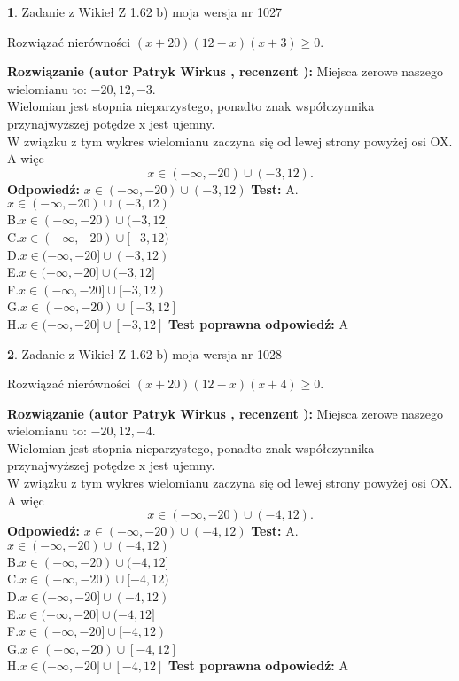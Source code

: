 \documentclass[12pt, a4paper]{article}
\theoremstyle{definition} %
\newtheorem{zad}{}
\newcommand{\zadStart}[1]{\begin{zad}#1\newline}
\newcommand{\zadStop}{\end{zad}}
\newcommand{\rozwStart}[2]{\noindent \textbf{Rozwiązanie (autor #1 , recenzent #2): }\newline}
\newcommand{\rozwStop}{\newline}
\newcommand{\odpStart}{\noindent \textbf{Odpowiedź:}\newline}
\newcommand{\odpStop}{\newline}
\newcommand{\testStart}{\noindent \textbf{Test:}\newline}
\newcommand{\testStop}{\newline}
\newcommand{\kluczStart}{\noindent \textbf{Test poprawna odpowiedź:}\newline}
\newcommand{\kluczStop}{\newline}
\begin{document}
\zadStart{Zadanie z Wikieł Z 1.62 b) moja wersja nr 1027}

Rozwiązać nierówności $(x+20)(12-x)(x+3)\ge0$.
\zadStop
\rozwStart{Patryk Wirkus}{}
Miejsca zerowe naszego wielomianu to: $-20, 12, -3$.\\
Wielomian jest stopnia nieparzystego, ponadto znak współczynnika przy\linebreak najwyższej potędze x jest ujemny.\\ W związku z tym wykres wielomianu zaczyna się od lewej strony powyżej osi OX. A więc $$x \in (-\infty,-20) \cup (-3,12).$$
\rozwStop
\odpStart
$x \in (-\infty,-20) \cup (-3,12)$
\odpStop
\testStart
A.$x \in (-\infty,-20) \cup (-3,12)$\\
B.$x \in (-\infty,-20) \cup (-3,12]$\\
C.$x \in (-\infty,-20) \cup [-3,12)$\\
D.$x \in (-\infty,-20] \cup (-3,12)$\\
E.$x \in (-\infty,-20] \cup (-3,12]$\\
F.$x \in (-\infty,-20] \cup [-3,12)$\\
G.$x \in (-\infty,-20) \cup [-3,12]$\\
H.$x \in (-\infty,-20] \cup [-3,12]$
\testStop
\kluczStart
A
\kluczStop



\zadStart{Zadanie z Wikieł Z 1.62 b) moja wersja nr 1028}

Rozwiązać nierówności $(x+20)(12-x)(x+4)\ge0$.
\zadStop
\rozwStart{Patryk Wirkus}{}
Miejsca zerowe naszego wielomianu to: $-20, 12, -4$.\\
Wielomian jest stopnia nieparzystego, ponadto znak współczynnika przy\linebreak najwyższej potędze x jest ujemny.\\ W związku z tym wykres wielomianu zaczyna się od lewej strony powyżej osi OX. A więc $$x \in (-\infty,-20) \cup (-4,12).$$
\rozwStop
\odpStart
$x \in (-\infty,-20) \cup (-4,12)$
\odpStop
\testStart
A.$x \in (-\infty,-20) \cup (-4,12)$\\
B.$x \in (-\infty,-20) \cup (-4,12]$\\
C.$x \in (-\infty,-20) \cup [-4,12)$\\
D.$x \in (-\infty,-20] \cup (-4,12)$\\
E.$x \in (-\infty,-20] \cup (-4,12]$\\
F.$x \in (-\infty,-20] \cup [-4,12)$\\
G.$x \in (-\infty,-20) \cup [-4,12]$\\
H.$x \in (-\infty,-20] \cup [-4,12]$
\testStop
\kluczStart
A
\kluczStop
\end{document}

